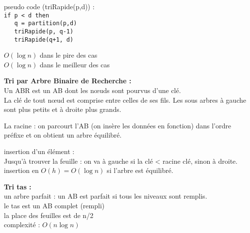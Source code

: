 \documentclass[8pt,a4paper]{extarticle}
\begin{document}
\begin{multicols}{3}
      pseudo code (triRapide(p,d)) :\\
      \verb|if p < d then|\\
      \verb|   q = partition(p,d)|\\
      \verb|   triRapide(p, q-1)|\\
      \verb|   triRapide(q+1, d)|


      \(O(\log n)\) dans le pire des cas\\
      \(O(\log n)\) dans le meilleur des cas

      \bigskip

      \textbf{Tri par Arbre Binaire de Recherche :}\\
      Un ABR est un AB dont les nœuds sont pourvus d'une clé.\\
      La clé de tout nœud est comprise entre celles de ses fils. Les sous arbres à gauche sont plus petits et à droite plus grands.

      La racine : on parcourt l'AB (on insère les données en fonction) dans l'ordre préfixe et on obtient un arbre équilibré.

      insertion d'un élément :\\
      Jusqu'à trouver la feuille : on va à gauche si la clé < racine clé, sinon à droite.\\
      insertion en \(O(h) = O(\log n)\) si l'arbre est équilibré.

      \bigskip

      \textbf{Tri tas :}\\
      un arbre parfait : un AB est parfait si tous les niveaux sont remplis.\\
      le tas est un AB complet (rempli)\\
      la place des feuilles est de n/2\\
      complexité : \(O(n \log n)\)

      \bigskip


\end{multicols}
\end{document}
